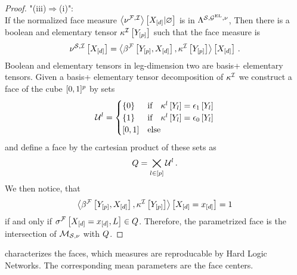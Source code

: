 \begin{proof}
    "(iii)$\Rightarrow$(i)": \\
    If the normalized face measure $\left\langle \nu^{\mathcal{F},\mathcal{I}}\right\rangle \left[ X_{[d]} | \varnothing \right]$ is in $\Lambda^{\mathcal{S},\mathcal{G}^{\mathrm{EL}},\nu}$,
    Then there is a boolean and elementary tensor $\kappa^{\mathcal{I}}\left[Y_{[p]}\right]$ such that the face measure is
    \begin{align*}
        \nu^{\mathcal{S},\mathcal{I}}\left[X_{[d]}\right]
        = \left\langle \beta^{\mathcal{F}}\left[Y_{[p]},X_{[d]}\right],\kappa^{\mathcal{I}}\left[Y_{[p]}\right]\right\rangle \left[ X_{[d]} \right] \, .
    \end{align*}
    Boolean and elementary tensors in leg-dimension two are basis+ elementary tensors.
    Given a basis+ elementary tensor decomposition of $\kappa^{\mathcal{I}}$ we construct a face of the cube $[0,1]^{p}$ by sets
    \begin{align*}
        \mathcal{U}^{l} = \begin{cases}
            \{0\} & \text{if} \quad \kappa^{l}\left[Y_{l}\right] = \epsilon_1\left[Y_{l}\right] \\
            \{1\} & \text{if} \quad \kappa^{l}\left[Y_{l}\right] = \epsilon_0\left[Y_{l}\right] \\
            [0,1] & \text{else}
        \end{cases}
    \end{align*}
    and define a face by the cartesian product of these sets as
    \begin{align*}
        Q = \bigtimes_{l\in[p]} \mathcal{U}^{l} \, .
    \end{align*}
    We then notice, that
    \begin{align*}
        \left\langle \beta^{\mathcal{F}}\left[Y_{[p]},X_{[d]}\right],\kappa^{\mathcal{I}}\left[Y_{[p]}\right]\right\rangle \left[ X_{[d]}=x_{[d]} \right] = 1
    \end{align*}
    if and only if $\sigma^{\mathcal{F}}\left[X_{[d]}=x_{[d]},L\right]\in Q$.
    Therefore, the parametrized face is the intersection of $\mathcal{M}_{\mathcal{S},\nu}$ with $Q$.
\end{proof}

 characterizes the faces, which measures are reproducable by Hard Logic Networks.
The corresponding mean parameters are the face centers.


